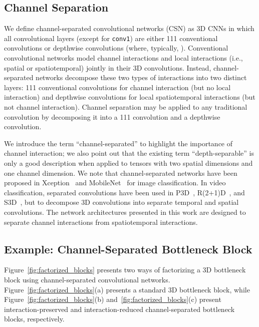 \documentclass[10pt,twocolumn,letterpaper]{article}
\newcommand{\ddd}[1]{#1#1#1}
\begin{document}
\subsection{Channel Separation} 
\label{sec:channel_separated_networks}

We define channel-separated convolutional networks (CSN) as 3D CNNs in which all convolutional layers (except for \texttt{conv1}) are either \ddd{1} conventional convolutions or \ddd{} depthwise convolutions (where, typically, ). Conventional convolutional networks model channel interactions and local interactions (i.e., spatial or spatiotemporal) jointly in their 3D  convolutions. Instead, channel-separated networks decompose these two types of interactions into two distinct layers: \ddd{1} conventional convolutions for channel interaction (but no local interaction) and \ddd{} depthwise convolutions for local spatiotemporal interactions (but not channel interaction). Channel separation may be applied to any \ddd{} traditional convolution by decomposing it into a \ddd{1} convolution and a depthwise \ddd{} convolution.



We introduce the term ``channel-separated'' to highlight the importance of channel interaction; we also point out that the existing term ``depth-separable'' is only a good description when applied to tensors with two spatial dimensions and one channel dimension. We note that channel-separated networks have been proposed in Xception~\cite{Xception} and MobileNet~\cite{MobileNet} for image classification. In video classification, separated convolutions have been used in P3D~\cite{P3D}, R(2+1)D~\cite{Tran18}, and S3D~\cite{xie2017rethinking}, but to decompose 3D convolutions into separate temporal and spatial convolutions. The network architectures presented in this work are designed to separate channel interactions from spatiotemporal interactions.

\subsection{Example: Channel-Separated Bottleneck Block}
\label{sec:lossy_lossless_csn}

Figure~\ref{fig:factorized_blocks} presents two ways of factorizing a 3D bottleneck block using channel-separated convolutional networks. Figure~\ref{fig:factorized_blocks}(a) presents a standard 3D bottleneck block, while Figure~\ref{fig:factorized_blocks}(b) and~\ref{fig:factorized_blocks}(c) present interaction-preserved and interaction-reduced channel-separated bottleneck blocks, respectively.
\end{document}
